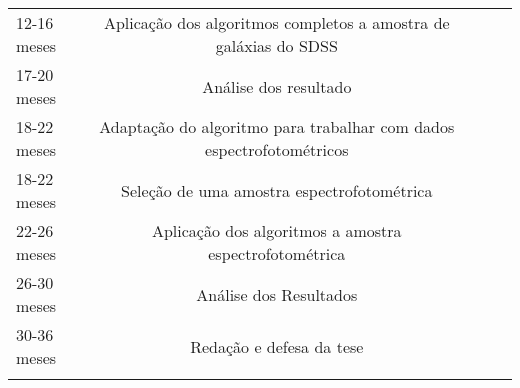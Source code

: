 \begin{center}
\begin{longtable}{lcccc}
12-16 meses & Aplica\c{c}\~ao dos algoritmos completos a amostra de gal\'axias do SDSS & \\

17-20 meses & An\'alise dos resultado & \\

18-22 meses & Adapta\c{c}\~ao do algoritmo para trabalhar com dados espectrofotom\'etricos & \\

18-22 meses & Sele\c{c}\~ao de uma amostra espectrofotom\'etrica & \\

22-26 meses & Aplica\c{c}\~ao dos algoritmos a amostra espectrofotom\'etrica & \\

26-30 meses & An\'alise dos Resultados & \\

30-36 meses & Reda\c{c}\~ao e defesa da tese & \\

\label{tabela1}
\end{longtable}
\end{center}